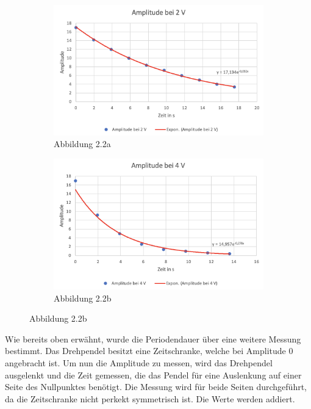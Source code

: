             \begin{figure}[H]
                \begin{subfigure}{0.48\textwidth}
                    \centering
                    \includegraphics[width=\textwidth]{bilder/plot_v1_2V.png}
                    \caption{Abbildung 2.2a}
                    \label{fig:plot_v1_2V}
                \end{subfigure}
                \begin{subfigure}{0.48\textwidth}
                    \centering
                    \includegraphics[width=\textwidth]{bilder/plot_v1_4V.png}
                    \caption{Abbildung 2.2b}
                    \label{fig:plot_v1_4V}
                \end{subfigure}
            \end{figure}

            Wie bereits oben erwähnt, wurde die Periodendauer über eine weitere Messung bestimmt. Das Drehpendel besitzt eine Zeitschranke, welche bei Amplitude $0$ angebracht ist. Um nun die Amplitude zu messen, wird das Drehpendel ausgelenkt und die Zeit gemessen, die das Pendel für eine Auslenkung auf einer Seite des Nullpunktes benötigt. Die Messung wird für beide Seiten durchgeführt, da die Zeitschranke nicht perkekt symmetrisch ist. Die Werte werden addiert.

